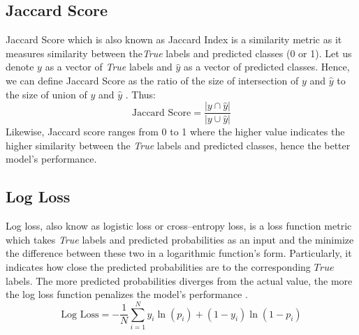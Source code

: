 \subsection{Jaccard Score}
Jaccard Score which is also known as Jaccard Index is a similarity metric as it measures similarity between the\textit{True} labels and predicted classes (0 or 1).
Let us denote $y$ as a vector of \textit{True} labels and $\hat{y}$ as a vector of predicted classes.
Hence, we can define Jaccard Score as the ratio of the size of intersection of $y$ and $\hat{y}$ to the size of union of $y$ and $\hat{y}$ \citep{leskovec2020mining}. Thus:
\begin{equation}\label{eq}
    \text{Jaccard Score} = \frac{|y \cap \hat{y} |}{|y \cup \hat{y} |}
\end{equation}
Likewise, Jaccard score ranges from 0 to 1 where the higher value indicates the higher similarity between the \textit{True} labels and predicted classes, hence the better model's performance.


\subsection{Log Loss}
\label{subsubsec:logloss}

Log loss, also know as logistic loss or cross--entropy loss, is a loss function metric which takes \textit{True} labels and predicted probabilities as an input and the minimize the difference between these two in a logarithmic function's form. Particularly, it indicates how close the predicted probabilities are to the corresponding $True$ labels. The more predicted probabilities diverges from the actual value, the more the log loss function penalizes the model's performance \citep{dembla2020intuition}.
\begin{equation}\label{eq}
    \text{Log Loss}  = -\frac{1}{N} \sum_{i=1}^{N} y_i \ln(p_i) + (1-y_i)\ln(1-p_i)
\end{equation}


